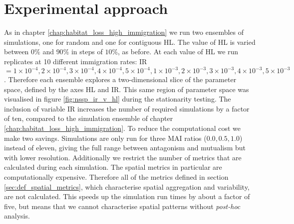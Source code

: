 
%


\section{Experimental approach}
\label{sec:exp_method}

As in chapter \ref{chap:habitat_loss_high_immigration} we run two ensembles of simulations, one for random and one for contiguous HL. The value of HL  is varied between $0\%$ and $90\%$ in steps of $10\%$, as before. At each value of HL we run replicates at 10 different immigration rates: IR$ = 1 \times 10^{-4},2 \times 10^{-4},3 \times 10^{-4},4 \times 10^{-4},5 \times 10^{-4},1 \times 10^{-3},2 \times 10^{-3},3 \times 10^{-3},4 \times 10^{-3},5 \times 10^{-3}$. Therefore each ensemble explores a two-dimensional slice of the parameter space, defined by the axes HL and IR. This same region of parameter space was visualised in figure \ref{fig:nssp_ir_v_hl} during the stationarity testing. The inclusion of variable IR increases the number of required simulations by a factor of ten, compared to the simulation ensemble of chapter \ref{chap:habitat_loss_high_immigration}. To reduce the computational cost we make two savings. Simulations are only run for three MAI ratios ($0.0,0.5,1.0$) instead of eleven, giving the full range between antagonism and mutualism but with lower resolution. Additionally we restrict the number of metrics that are calculated during each simulation. The spatial metrics in particular are computationally expensive. Therefore all of the metrics defined in section \ref{sec:def_spatial_metrics}, which characterise spatial aggregation and variability, are not calculated. This speeds up the simulation run times by about a factor of five, but means that we cannot characterise spatial patterns without \emph{post-hoc} analysis.

